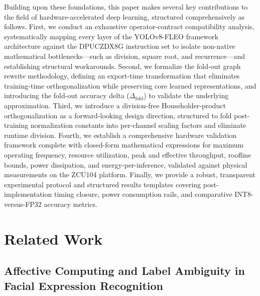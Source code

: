 \documentclass[algorithms,article,submit,moreauthors]{Definitions/mdpi}
\begin{document}
Building upon these foundations, this paper makes several key contributions to the field of hardware-accelerated deep learning, structured comprehensively as follows. First, we conduct an exhaustive operator-contract compatibility analysis, systematically mapping every layer of the YOLOv8-FLEO framework architecture against the DPUCZDX8G instruction set to isolate non-native mathematical bottlenecks—such as division, square root, and recurrence—and establishing structural workarounds. Second, we formalize the fold-out graph rewrite methodology, defining an export-time transformation that eliminates training-time orthogonalization while preserving core learned representations, and introducing the fold-out accuracy delta ($\Delta_{\mathrm{fold}}$) to validate the underlying approximation. Third, we introduce a division-free Householder-product orthogonalization as a forward-looking design direction, structured to fold post-training normalization constants into per-channel scaling factors and eliminate runtime division. Fourth, we establish a comprehensive hardware validation framework complete with closed-form mathematical expressions for maximum operating frequency, resource utilization, peak and effective throughput, roofline bounds, power dissipation, and energy-per-inference, validated against physical measurements on the ZCU104 platform. Finally, we provide a robust, transparent experimental protocol and structured results templates covering post-implementation timing closure, power consumption rails, and comparative INT8-versus-FP32 accuracy metrics.



\section{Related Work} \label{sec:related}

\subsection{Affective Computing and Label Ambiguity in Facial Expression Recognition}
\end{document}
